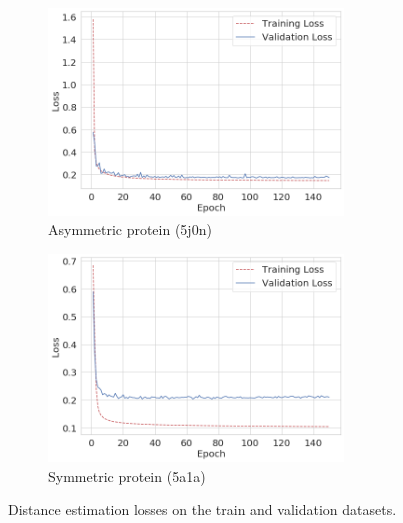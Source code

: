 \begin{figure}
    \centering
    \begin{subfigure}[t]{0.45\textwidth}
        \includegraphics[height=5.5cm]{images/de_5j0n.png}
        \caption{Asymmetric protein (5j0n)}
        \label{fig:losses-siamese-assym}
    \end{subfigure} \quad \quad
    \begin{subfigure}[t]{0.5\textwidth}
        \includegraphics[height=5.5cm]{images/de_5a1a.png}
        \caption{Symmetric protein (5a1a)}
        \label{fig:losses-siamese-sym}
    \end{subfigure}
    \caption{Distance estimation losses on the train and validation datasets.}
    \label{fig:losses-siamese}
\end{figure}

